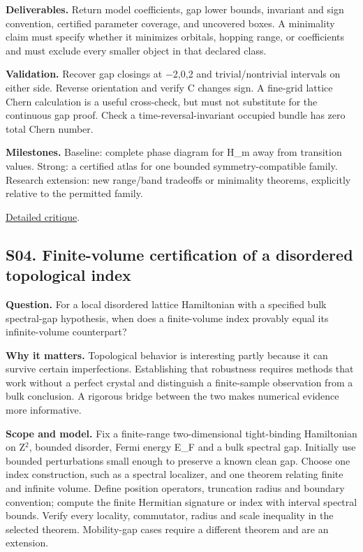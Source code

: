 \documentclass[
  11pt,
]{article}
\begin{document}
\textbf{Deliverables.} Return model coefficients, gap lower bounds,
invariant and sign convention, certified parameter coverage, and
uncovered boxes. A minimality claim must specify whether it minimizes
orbitals, hopping range, or coefficients and must exclude every smaller
object in that declared class.

\textbf{Validation.} Recover gap closings at \ensuremath{-}2,0,2 and
trivial/nontrivial intervals on either side. Reverse orientation and
verify C changes sign. A fine-grid lattice Chern calculation is a useful
cross-check, but must not substitute for the continuous gap proof. Check
a time-reversal-invariant occupied bundle has zero total Chern number.

\textbf{Milestones.} Baseline: complete phase diagram for H\_m away from
transition values. Strong: a certified atlas for one bounded
symmetry-compatible family. Research extension: new range/band tradeoffs
or minimality theorems, explicitly relative to the permitted family.

\href{https://github.com/rick-stevens-ai/Pure-Thought/blob/main/reviews/09-Topological-Band-Theory.md}{Detailed
critique}.

\subsection{S04. Finite-volume certification of a disordered topological
index}

\textbf{Question.} For a local disordered lattice Hamiltonian with a
specified bulk spectral-gap hypothesis, when does a finite-volume index
provably equal its infinite-volume counterpart?

\textbf{Why it matters.} Topological behavior is interesting partly
because it can survive certain imperfections. Establishing that
robustness requires methods that work without a perfect crystal and
distinguish a finite-sample observation from a bulk conclusion. A
rigorous bridge between the two makes numerical evidence more
informative.

\textbf{Scope and model.} Fix a finite-range two-dimensional
tight-binding Hamiltonian on Z\ensuremath{{}^{2}}, bounded disorder,
Fermi energy E\_F and a bulk spectral gap. Initially use bounded
perturbations small enough to preserve a known clean gap. Choose one
index construction, such as a spectral localizer, and one theorem
relating finite and infinite volume. Define position operators,
truncation radius and boundary convention; compute the finite Hermitian
signature or index with interval spectral bounds. Verify every locality,
commutator, radius and scale inequality in the selected theorem.
Mobility-gap cases require a different theorem and are an extension.
\end{document}
